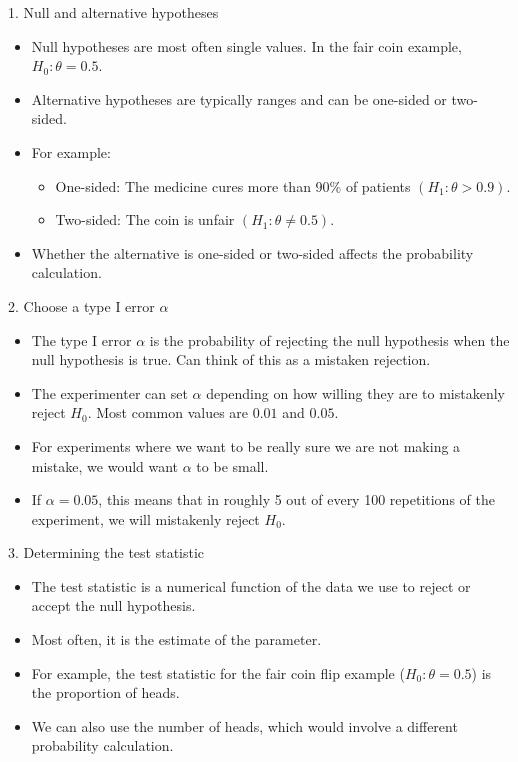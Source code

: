\documentclass[10pt, handout, xcolor=table]{beamer}
\newcommand*\themecol{\usebeamercolor[fg]{structure}}
\begin{document}
\begin{frame}{1. Null and alternative hypotheses}

\begin{itemize}\itemsep3ex
\item Null hypotheses are most often single values. In the fair coin example, $H_0: \theta = 0.5$.
\item Alternative hypotheses are typically ranges and can be {\themecol one-sided} or {\themecol two-sided}.
\item For example:
\begin{itemize}
\item One-sided: The medicine cures more than 90\% of patients $(H_1: \theta > 0.9)$.
\item Two-sided: The coin is unfair $(H_1: \theta \neq 0.5)$.
\end{itemize}
\item Whether the alternative is one-sided or two-sided affects the probability calculation.
\end{itemize}

\end{frame}

\begin{frame}{2. Choose a type I error $\alpha$}

\begin{itemize}\itemsep3ex
\item The type I error $\alpha$ is the probability of rejecting the null hypothesis when the null hypothesis is true. Can think of this as a mistaken rejection.
\item The experimenter can set $\alpha$ depending on how willing they are to mistakenly reject $H_0$. Most common values are $0.01$ and $0.05$.
\item For experiments where we want to be really sure we are not making a mistake, we would want $\alpha$ to be small.
\item If $\alpha = 0.05$, this means that in roughly 5 out of every 100 repetitions of the experiment, we will mistakenly reject $H_0$.
\end{itemize}

\end{frame}

\begin{frame}{3. Determining the test statistic}

\begin{itemize}\itemsep4ex
\item The test statistic is a numerical function of the data we use to reject or accept the null hypothesis.
\item Most often, it is the estimate of the parameter.
\item For example, the test statistic for the fair coin flip example ($H_0: \theta = 0.5$) is the proportion of heads.
\item We can also use the number of heads, which would involve a different probability calculation.
\end{itemize}

\end{frame}
\end{document}
